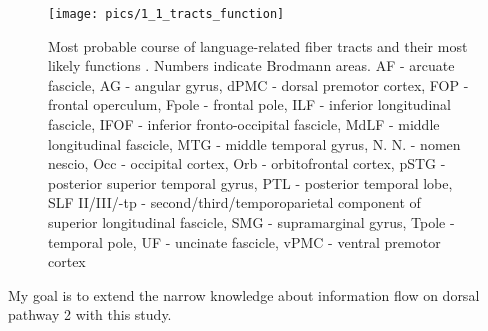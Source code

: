 \begin{figure}[h]
\begin{center}
\vspace{7mm}
\texttt{[image: pics/1\_1\_tracts\_function]}
\caption{\label{1.1.neuron.illustrated} Most probable course of language-related fiber tracts and their most likely functions \cite{1.1.Gierhan}. Numbers indicate Brodmann areas. AF - arcuate fascicle, AG - angular gyrus, dPMC - dorsal premotor cortex, FOP - frontal operculum, Fpole - frontal pole, ILF - inferior longitudinal fascicle, IFOF - inferior fronto-occipital fascicle, MdLF - middle longitudinal fascicle, MTG - middle temporal gyrus, N. N. - nomen nescio, Occ - occipital cortex, Orb - orbitofrontal cortex, pSTG - posterior superior temporal gyrus, PTL - posterior temporal lobe, SLF II/III/-tp - second/third/temporoparietal component of superior longitudinal fascicle, SMG - supramarginal gyrus, Tpole - temporal pole, UF - uncinate fascicle, vPMC - ventral premotor cortex}
\end{center}
\end{figure}

My goal is to extend the narrow knowledge about information flow on dorsal pathway 2 with this study.